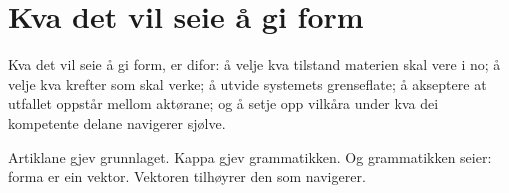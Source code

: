 \documentclass[12pt,a4paper,oneside]{report}
\begin{document}
\section{Kva det vil seie å gi form}

Kva det vil seie å gi form, er difor: å velje kva tilstand materien skal vere i no; å velje kva krefter som skal verke; å utvide systemets grenseflate; å akseptere at utfallet oppstår mellom aktørane; og å setje opp vilkåra under kva dei kompetente delane navigerer sjølve.

Artiklane gjev grunnlaget. Kappa gjev grammatikken. Og grammatikken seier: forma er ein vektor. Vektoren tilhøyrer den som navigerer.

\end{document}
